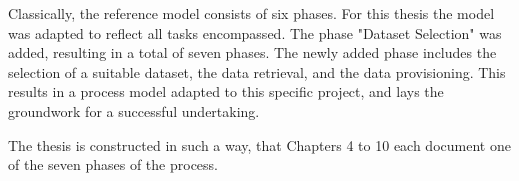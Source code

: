 Classically, the reference model consists of six phases. For this thesis the model was adapted to reflect all tasks encompassed. The phase "Dataset Selection" was added, resulting in a total of seven phases. The newly added phase includes the selection of a suitable dataset, the data retrieval, and the data provisioning. This results in a process model adapted to this specific project, and lays the groundwork for a successful undertaking.

The thesis is constructed in such a way, that Chapters 4 to 10 each document one of the seven phases of the process.

 